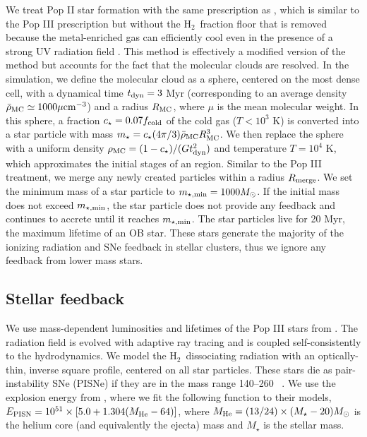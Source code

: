 \documentclass[apjl]{emulateapj}
\newcommand{\cubecm}{\ifmmode{{\rm cm^{-3}}}\else{cm$^{-3}$}\fi}
\newcommand{\Ms}{\ifmmode{M_\odot}\else{$M_\odot$}\fi}
\newcommand{\hh}{H$_2$}
\begin{document}
We treat Pop II star formation with the same prescription as
\citet{Wise09}, which is similar to the Pop III prescription but
without the \hh~fraction floor that is removed because the
metal-enriched gas can efficiently cool even in the presence of a
strong UV radiation field \citep[e.g.][]{Safranek10}.  This method is
effectively a modified version of the \citet{Cen92} method but
accounts for the fact that the molecular clouds are resolved.  In the
simulation, we define the molecular cloud as a sphere, centered on the
most dense cell, with a dynamical time $t_{\rm dyn} = 3$ Myr
(corresponding to an average density $\bar{\rho}_{\rm MC} \simeq
1000\mu \cubecm$) and a radius $R_{\rm MC}$, where $\mu$ is the mean
molecular weight.  In this sphere, a fraction $c_\star = 0.07 f_{\rm
  cold}$ of the cold gas ($T < 10^3$ K) is converted into a star
particle with mass $m_\star = c_\star (4\pi/3) \bar{\rho}_{\rm MC}
R_{\rm MC}^3$.  We then replace the sphere with a uniform density
$\rho_{\rm MC} = (1 - c_\star) / (Gt_{\rm dyn}^2)$ and temperature $T
= 10^4$ K, which approximates the initial stages of an 
region.  Similar to the Pop III treatment, we merge any newly created
particles within a radius $R_{\rm merge}$.  We set the minimum mass of
a star particle to $m_{\rm \star, min} = 1000 \Ms$.  If the initial
mass does not exceed $m_{\rm \star, min}$, the star particle does not
provide any feedback and continues to accrete until it reaches $m_{\rm
  \star, min}$.  The star particles live for 20 Myr, the maximum
lifetime of an OB star.  These stars generate the majority of the
ionizing radiation and SNe feedback in stellar clusters, thus we
ignore any feedback from lower mass stars.

\subsection{Stellar feedback}

We use mass-dependent luminosities and lifetimes of the Pop III stars
from \citet{Schaerer02}.  The radiation field is evolved with adaptive
ray tracing \citep{Abel02_RT, Wise10} and is coupled self-consistently
to the hydrodynamics.  We model the \hh~dissociating radiation with an
optically-thin, inverse square profile, centered on all star
particles.  These stars die as pair-instability SNe (PISNe) if they
are in the mass range 140--260 \Ms~\citep{Heger03}.  We use the
explosion energy from \citet{Heger02}, where we fit the following
function to their models, $E_{\rm PISN} = 10^{51} \times [5.0 + 1.304
  (M_{\rm He} - 64)]$, where $M_{\rm He} = (13/24) \times (M_\star -
20) \Ms$ is the helium core (and equivalently the ejecta) mass and
$M_\star$ is the stellar mass.
\end{document}
